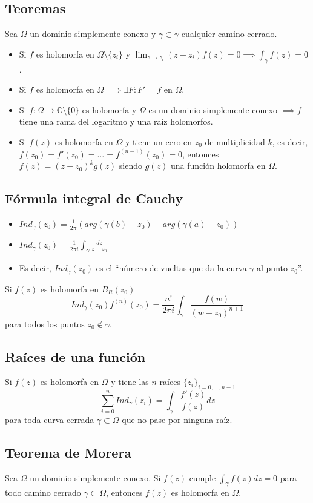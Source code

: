 \documentclass[paper=a4, fontsize=11pt]{scrartcl}
\numberwithin{equation}{section}
\numberwithin{figure}{section}
\numberwithin{table}{section}
\begin{document}
\subsection{Teoremas}
Sea $\Omega$ un dominio simplemente conexo y $\gamma\subset\gamma$ cualquier camino cerrado.
\begin{itemize}
\item Si $f$ es holomorfa en $\Omega\setminus\{z_i\}$ y $\lim_{z\to z_i} (z-z_i)f(z) = 0 \implies \int_{\gamma}f(z) = 0$.
\item Si $f$ es holomorfa en $\Omega$ $\implies \exists F: F'=f$ en $\Omega$.
\item Si $f:\Omega\to\mathbb{C}\setminus\{0\}$ es holomorfa y $\Omega$ es un dominio simplemente conexo $\implies f$ tiene una rama del logaritmo y una raíz holomorfos.
\item Si $f(z)$ es holomorfa en $\Omega$ y tiene un cero en $z_0$ de multiplicidad $k$, es decir, $f(z_0) = f'(z_0) = \hdots = f^{(n-1)}(z_0) = 0$, entonces $f(z) = (z-z_0)^kg(z)$ siendo $g(z)$ una función holomorfa en $\Omega$.
\end{itemize}

\subsection{Fórmula integral de Cauchy}
\begin{itemize}
\item $Ind_\gamma (z_0) = \frac{1}{2\pi}\left(arg(\gamma(b)-z_0)-arg(\gamma(a)-z_0)\right)$
\item $Ind_\gamma (z_0) = \frac{1}{2πi}\int_\gamma \frac{dz}{z-z_0}$
\item Es decir, $Ind_\gamma (z_0)$ es el ``número de vueltas que da la curva $\gamma$ al punto $z_0$''.
\end{itemize}
Si $f(z)$ es holomorfa en $B_R(z_0)$
$$\boxed{Ind_\gamma(z_0) f^{(n)}(z_0) = \frac{n!}{2\pi i}\int_\gamma \frac{f(w)}{(w-z_0)^{n+1}}}$$
para todos los puntos $z_0\notin \gamma$.

\subsection{Raíces de una función}
Si $f(z)$ es holomorfa en $\Omega$ y tiene las $n$ raíces $\{{z_i}\}_{i=0,\hdots,n-1}$
$$\sum_{i=0}^n Ind_\gamma(z_i) = \int_\gamma \frac{f'(z)}{f(z)}dz$$
para toda curva cerrada $\gamma\subset\Omega$ que no pase por ninguna raíz.

\subsection{Teorema de Morera}
Sea $\Omega$ un dominio simplemente conexo. Si $f(z)$ cumple $\int_{\gamma} f(z)dz = 0$ para todo camino cerrado $\gamma\subset\Omega$, entonces $f(z)$ es holomorfa en $\Omega$.
\end{document}
